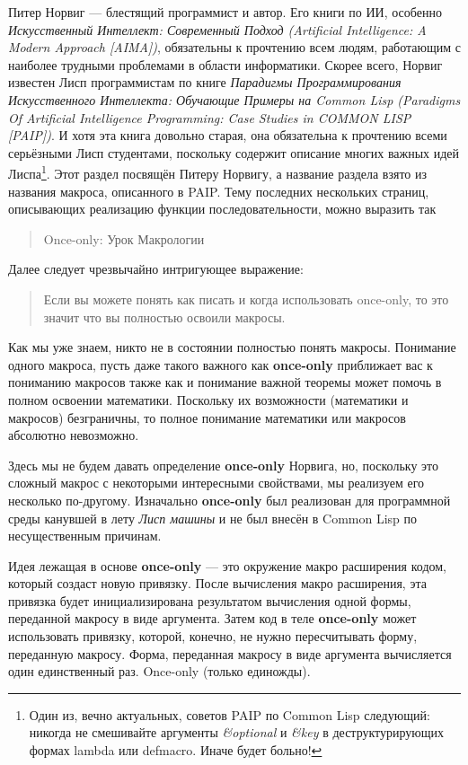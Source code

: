 Питер Норвиг --- блестящий программист и автор. Его книги по ИИ, особенно \emph{Искусственный Интеллект: Современный Подход (Artificial Intelligence: A Modern Approach [AIMA])}, обязательны к прочтению всем людям, работающим с наиболее трудными проблемами в области информатики. Скорее всего, Норвиг известен Лисп программистам по книге \emph{Парадигмы Программирования Искусственного Интеллекта: Обучающие Примеры на Common Lisp {(Paradigms Of Artificial Intelligence Programming: Case Studies in COMMON LISP [PAIP])}}. И хотя эта книга довольно старая, она обязательна к прочтению всеми серьёзными Лисп студентами, поскольку содержит описание многих важных идей Лиспа\footnote{Один из, вечно актуальных, советов PAIP по Common Lisp следующий: никогда не смешивайте аргументы \emph{\&optional} и \emph{\&key} в деструктурирующих формах lambda или defmacro. Иначе будет больно!}. Этот раздел посвящён Питеру Норвигу, а название раздела взято из названия макроса, описанного в PAIP. Тему последних нескольких страниц, описывающих реализацию функции последовательности, можно выразить так

\begin{quote}
Once-only: Урок Макрологии
\end{quote}

Далее следует чрезвычайно интригующее выражение:

\begin{quote}
Если вы можете понять как писать и когда использовать once-only, то это значит что вы полностью освоили макросы.
\end{quote}

Как мы уже знаем, никто не в состоянии полностью понять макросы. Понимание одного макроса, пусть даже такого важного как \textbf{once-only} приближает вас к пониманию макросов также как и понимание важной теоремы может помочь в полном освоении математики. Поскольку их возможности (математики и макросов) безграничны, то полное понимание математики или макросов абсолютно невозможно.

Здесь мы не будем давать определение \textbf{once-only} Норвига, но, поскольку это сложный макрос с некоторыми интересными свойствами, мы реализуем его несколько по-другому. Изначально \textbf{once-only} был реализован для программной среды канувшей в лету \emph{Лисп машины} и не был внесён в Common Lisp по несущественным причинам.

Идея лежащая в основе \textbf{once-only} --- это окружение макро расширения кодом, который создаст новую привязку. После вычисления макро расширения, эта привязка будет инициализирована результатом вычисления одной формы, переданной макросу в виде аргумента. Затем код в теле \textbf{once-only} может использовать привязку, которой, конечно, не нужно пересчитывать форму, переданную макросу. Форма, переданная макросу в виде аргумента вычисляется один единственный раз. Once-only (только единожды).

